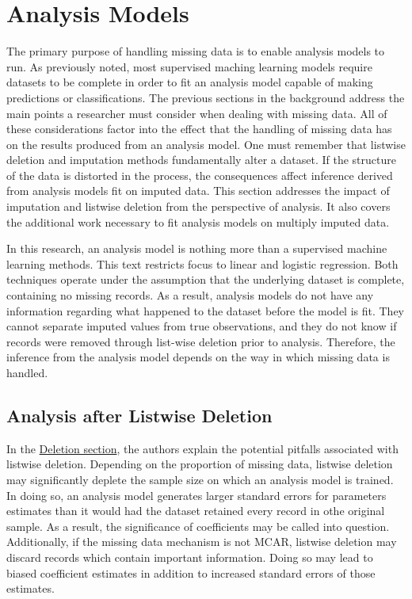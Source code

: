 \documentclass[12pt,oneside]{chicagocapstone}
\begin{document}
\section*{Analysis Models}\label{background-analysis}

The primary purpose of handling missing data is to enable analysis
models to run. As previously noted, most supervised maching learning
models require datasets to be complete in order to fit an analysis model
capable of making predictions or classifications. The previous sections
in the background address the main points a researcher must consider
when dealing with missing data. All of these considerations factor into
the effect that the handling of missing data has on the results produced
from an analysis model. One must remember that listwise deletion and
imputation methods fundamentally alter a dataset. If the structure of
the data is distorted in the process, the consequences affect inference
derived from analysis models fit on imputed data. This section addresses
the impact of imputation and listwise deletion from the perspective of
analysis. It also covers the additional work necessary to fit analysis
models on multiply imputed data.

In this research, an analysis model is nothing more than a supervised
machine learning methods. This text restricts focus to linear and
logistic regression. Both techniques operate under the assumption that
the underlying dataset is complete, containing no missing records. As a
result, analysis models do not have any information regarding what
happened to the dataset before the model is fit. They cannot separate
imputed values from true observations, and they do not know if records
were removed through list-wise deletion prior to analysis. Therefore,
the inference from the analysis model depends on the way in which
missing data is handled.

\subsection*{Analysis after Listwise
Deletion}\label{background-analysis-listwise}

In the \protect\hyperlink{background-deletion}{Deletion section}, the
authors explain the potential pitfalls associated with listwise
deletion. Depending on the proportion of missing data, listwise deletion
may significantly deplete the sample size on which an analysis model is
trained. In doing so, an analysis model generates larger standard errors
for parameters estimates than it would had the dataset retained every
record in othe original sample. As a result, the significance of
coefficients may be called into question. Additionally, if the missing
data mechanism is not MCAR, listwise deletion may discard records which
contain important information. Doing so may lead to biased coefficient
estimates in addition to increased standard errors of those estimates.
\end{document}
